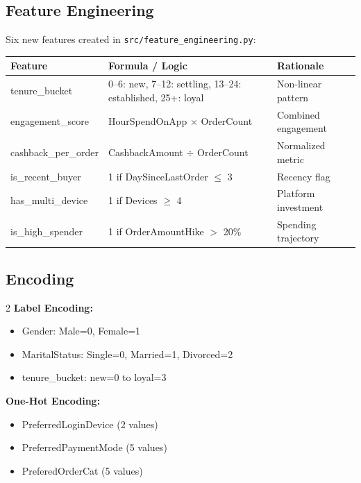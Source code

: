 \documentclass[11pt,a4paper]{article}
\newcommand{\tech}[1]{\texttt{\small\color{primarydark}#1}}
\begin{document}
\subsection{Feature Engineering}

Six new features created in \tech{src/feature\_engineering.py}:

\begin{table}[H]
\centering
{}
\begin{tabularx}{\textwidth}{l X l}
\toprule
\textbf{Feature} & \textbf{Formula / Logic} & \textbf{Rationale} \\
\midrule
tenure\_bucket & 0--6: new, 7--12: settling, 13--24: established, 25+: loyal & Non-linear pattern \\
engagement\_score & HourSpendOnApp $\times$ OrderCount & Combined engagement \\
cashback\_per\_order & CashbackAmount $\div$ OrderCount & Normalized metric \\
is\_recent\_buyer & 1 if DaySinceLastOrder $\leq$ 3 & Recency flag \\
has\_multi\_device & 1 if Devices $\geq$ 4 & Platform investment \\
is\_high\_spender & 1 if OrderAmountHike $>$ 20\% & Spending trajectory \\
\bottomrule
\end{tabularx}
\end{table}

\subsection{Encoding}

\begin{multicols}{2}
\textbf{\color{primary}Label Encoding:}
\begin{itemize}[leftmargin=*, nosep]
    \item Gender: Male=0, Female=1
    \item MaritalStatus: Single=0, Married=1, Divorced=2
    \item tenure\_bucket: new=0 to loyal=3
\end{itemize}

\columnbreak

\textbf{\color{primary}One-Hot Encoding:}
\begin{itemize}[leftmargin=*, nosep]
    \item PreferredLoginDevice (2 values)
    \item PreferredPaymentMode (5 values)
    \item PreferedOrderCat (5 values)
\end{itemize}
\end{multicols}
\end{document}
